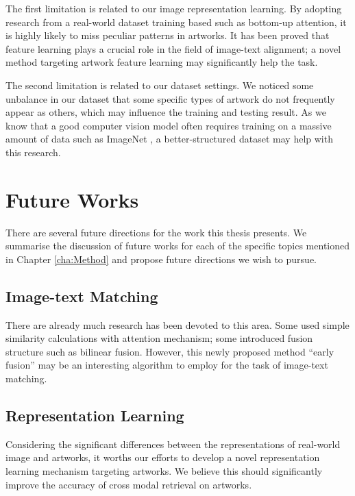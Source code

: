 The first limitation is related to our image representation learning. By adopting research from a real-world dataset training based such as bottom-up attention, it is highly likely to miss peculiar patterns in artworks. It has been proved that feature learning plays a crucial role in the field of image-text alignment; a novel method targeting artwork feature learning may significantly help the task.

The second limitation is related to our dataset settings. We noticed some unbalance in our dataset that some specific types of artwork do not frequently appear as others, which may influence the training and testing result. As we know that a good computer vision model often requires training on a massive amount of data such as ImageNet \cite{imagenet}, a better-structured dataset may help with this research.

\section{Future Works}
There are several future directions for the work this thesis presents. We summarise the discussion of future works for each of the specific topics mentioned in Chapter \ref{cha:Method} and propose future directions we wish to pursue.

\subsection{Image-text Matching}
There are already much research has been devoted to this area. Some used simple similarity calculations with attention mechanism; some introduced fusion structure such as bilinear fusion. However, this newly proposed method ``early fusion'' may be an interesting algorithm to employ for the task of image-text matching.

\subsection{Representation Learning}
Considering the significant differences between the representations of real-world image and artworks, it worths our efforts to develop a novel representation learning mechanism targeting artworks. We believe this should significantly improve the accuracy of cross modal retrieval on artworks.




